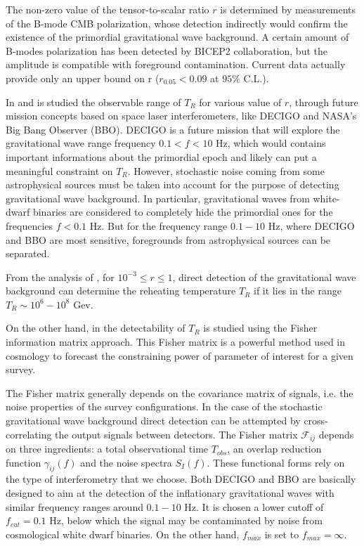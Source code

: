 \documentclass[11pt,a4paper,twoside]{book}
\begin{document}
The non-zero value of the tensor-to-scalar ratio $ r $ is determined by measurements of the B-mode CMB polarization,  whose detection indirectly would confirm the existence of the primordial gravitational wave background. A certain amount of B-modes polarization has been detected  by BICEP2 collaboration, but the amplitude is compatible with foreground contamination. Current data actually provide only an upper bound on r ($ r_{0.05} < 0.09 $ at $ 95 \% $ C.L.).

In \cite{Chap3:ProibingReheatingTemperature2008} and \cite{Chap3:ProspectsForDeterminationWithDetectors} is studied the observable range of $ T_{R} $  for various value of $ r $, through future mission concepts based on space laser interferometers, like DECIGO \cite{Chap3: DECIGO} and NASA's Big Bang Observer (BBO). DECIGO is a future mission that will explore the gravitational wave range frequency $ 0.1 < f < 10 $ Hz, which would contains important informations about the primordial epoch and likely can put a meaningful constraint on $ T_{R} $. However, stochastic noise coming from some astrophysical sources must be taken into account for the purpose of detecting gravitational wave background. In particular, gravitational waves from white-dwarf binaries are considered to completely hide the primordial ones for the frequencies $ f<0.1 $ Hz. But for the frequency range $ 0.1-10 $ Hz, where DECIGO and BBO are most sensitive, foregrounds from astrophysical sources can be separated. 

From the analysis of \cite{Chap3:ProibingReheatingTemperature2008}, for $ 10^{-3} \le r \le 1 $, direct detection of the gravitational wave background can determine the reheating temperature $ T_{R} $ if it lies in the range $ T_{R} \sim 10^{6}-10^{8} $ Gev.

On the other hand, in \cite{Chap3:ProspectsForDeterminationWithDetectors} the detectability of $ T_{R} $ is studied using the Fisher information matrix approach. This Fisher matrix is a powerful method used in cosmology to forecast the constraining power of parameter of interest for a given survey.

The Fisher matrix  generally depends on the covariance matrix of signals, i.e. the noise properties of the survey configurations. In the case of the stochastic gravitational wave background direct detection can be attempted by cross-correlating the output signals between detectors. The Fisher matrix $ \mathcal{F}_{ij} $ depends on three ingredients: a total observational time $ T_{obs} $, an overlap reduction function $ \gamma_{ij}(f) $ and the noise spectra $ S_{I}(f) $. These functional forms rely on the type of interferometry that we choose. Both DECIGO and BBO are basically designed to aim at the detection of the inflationary gravitational waves with similar frequency ranges around $ 0.1-10 $ Hz. It is chosen a lower cutoff of $ f_{cut}=0.1  $ Hz, below which the signal may be contaminated by noise from cosmological white dwarf binaries. On the other hand, $ f_{max} $ is set to $ f_{max}=\infty $. 
\end{document}
